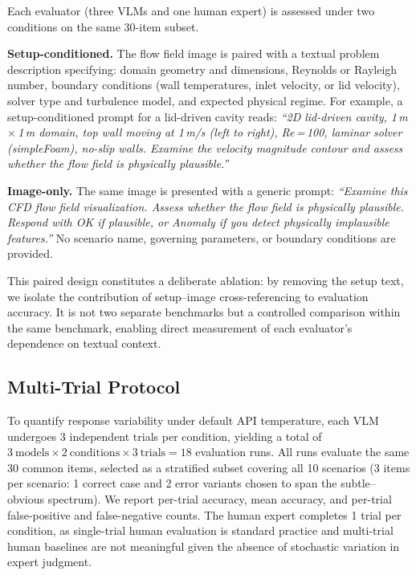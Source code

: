 \documentclass[preprint,12pt]{elsarticle}
\begin{document}
Each evaluator (three VLMs and one human expert) is assessed under two
conditions on the same 30-item subset.

\textbf{Setup-conditioned.} The flow field image is paired with a textual
problem description specifying: domain geometry and dimensions, Reynolds or
Rayleigh number, boundary conditions (wall temperatures, inlet velocity, or lid
velocity), solver type and turbulence model, and expected physical regime.
For example, a setup-conditioned prompt for a lid-driven cavity reads:
\emph{``2D lid-driven cavity, 1\,m\,$\times$\,1\,m domain, top wall moving at
1\,m/s (left to right), Re\,=\,100, laminar solver (simpleFoam), no-slip walls.
Examine the velocity magnitude contour and assess whether the flow field is
physically plausible.''}

\textbf{Image-only.} The same image is presented with a generic prompt:
\emph{``Examine this CFD flow field visualization. Assess whether the flow
field is physically plausible. Respond with OK if plausible, or Anomaly if
you detect physically implausible features.''}
No scenario name, governing parameters, or boundary conditions are provided.

This paired design constitutes a deliberate ablation: by removing the setup text,
we isolate the contribution of setup--image cross-referencing to evaluation
accuracy. It is not two separate benchmarks but a controlled comparison within
the same benchmark, enabling direct measurement of each evaluator's dependence
on textual context.

\subsection{Multi-Trial Protocol}
\label{sec:multi-trial}

To quantify response variability under default API temperature, each VLM
undergoes 3 independent trials per condition, yielding a total of
$3~\text{models} \times 2~\text{conditions} \times 3~\text{trials} = 18$
evaluation runs. All runs evaluate the same 30 common items, selected as a
stratified subset covering all 10 scenarios (3 items per scenario: 1 correct
case and 2 error variants chosen to span the subtle--obvious spectrum). We
report per-trial accuracy, mean accuracy, and per-trial false-positive and
false-negative counts. The human expert completes 1 trial per condition, as
single-trial human evaluation is standard practice and multi-trial human
baselines are not meaningful given the absence of stochastic variation in expert
judgment.
\end{document}
